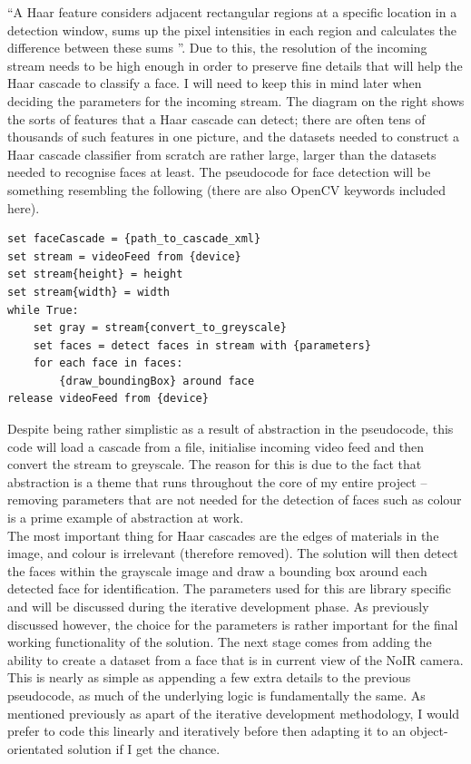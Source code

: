\documentclass[9pt]{article}
\begin{document}
“A Haar feature considers adjacent rectangular regions at a specific location in a detection window, sums up the pixel intensities in each region and calculates the difference between these sums \cite{haarInformation}”. Due to this, the resolution of the incoming stream needs to be high enough in order to preserve fine details that will help the Haar cascade to classify a face. I will need to keep this in mind later when deciding the parameters for the incoming stream. The diagram on the right shows the sorts of features that a Haar cascade can detect; there are often tens of thousands of such features in one picture, and the datasets needed to construct a Haar cascade classifier from scratch are rather large, larger than the datasets needed to recognise faces at least.
The pseudocode for face detection will be something resembling the following (there are also OpenCV keywords included here).
\begin{lstlisting}
set faceCascade = {path_to_cascade_xml} 
set stream = videoFeed from {device}
set stream{height} = height
set stream{width} = width
while True:
	set gray = stream{convert_to_greyscale}
	set faces = detect faces in stream with {parameters}
	for each face in faces:
		{draw_boundingBox} around face
release videoFeed from {device}
\end{lstlisting}
Despite being rather simplistic as a result of abstraction in the pseudocode, this code will load a cascade from a file, initialise incoming video feed and then convert the stream to greyscale. The reason for this is due to the fact that abstraction is a theme that runs throughout the core of my entire project -- removing parameters that are not needed for the detection of faces such as colour is a prime example of abstraction at work. \\
The most important thing for Haar cascades are the edges of materials in the image, and colour is irrelevant (therefore removed). The solution will then detect the faces within the grayscale image and draw a bounding box around each detected face for identification. The parameters used for this are library specific and will be discussed during the iterative development phase. As previously discussed however, the choice for the parameters is rather important for the final working functionality of the solution. 
The next stage comes from adding the ability to create a dataset from a face that is in current view of the NoIR camera. This is nearly as simple as appending a few extra details to the previous pseudocode, as much of the underlying logic is fundamentally the same. As mentioned previously as apart of the iterative development methodology, I would prefer to code this linearly and iteratively before then adapting it to an object-orientated solution if I get the chance.
\end{document}
